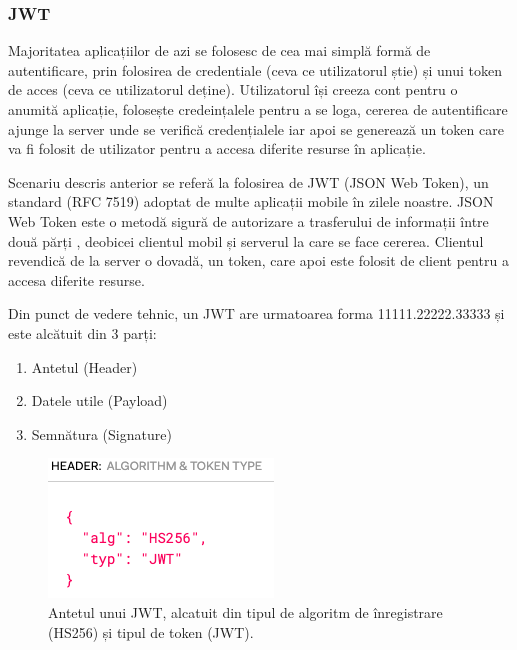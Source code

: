 \documentclass[12pt]{article}
\begin{document}
\subsubsection{JWT}

Majoritatea aplicațiilor de azi se folosesc de cea mai simplă formă de autentificare,
prin folosirea de credentiale (ceva ce utilizatorul știe) și unui token de acces (ceva
ce utilizatorul deține). Utilizatorul își creeza cont pentru o anumită aplicație, folosește
credeințalele pentru a se loga, cererea de autentificare ajunge la server unde se verifică
credențialele iar apoi se generează un token care va fi folosit de utilizator pentru a accesa
diferite resurse în aplicație.

Scenariu descris anterior se referă la folosirea de JWT (JSON Web Token), un standard (RFC 7519) \cite{rfc-7519} 
adoptat de multe aplicații mobile în zilele noastre. 
JSON Web Token este o metodă sigură de autorizare a trasferului
de informații între două părți \cite{jwt}, deobicei 
clientul mobil și serverul la care se face cererea. Clientul revendică de la server
o dovadă, un token, care apoi este folosit de client pentru a accesa diferite 
resurse.

Din punct de vedere tehnic, un JWT are urmatoarea forma 11111.22222.33333 și este
alcătuit din 3 parți:

\begin{enumerate}
    \item Antetul (Header)
    \item Datele utile (Payload)
    \item Semnătura (Signature)
\end{enumerate}


\begin{figure}[H]
    \begin{minipage}[c]{0.5\textwidth}
        \includegraphics[width=\textwidth]{jwt-header.png}
    \end{minipage}\hfill
    \begin{minipage}[c]{0.5\textwidth}
        \caption{Antetul unui JWT, alcatuit din tipul de algoritm 
        de înregistrare (HS256) și tipul de token (JWT).}
    \end{minipage}
\end{figure}
\end{document}
